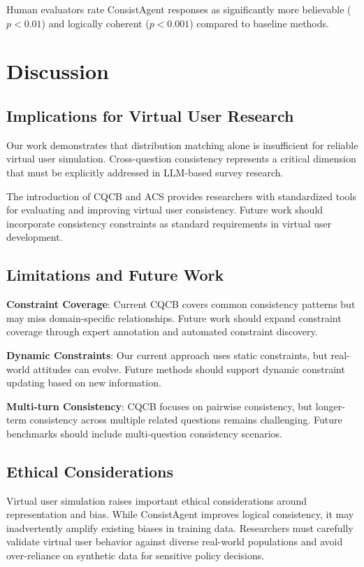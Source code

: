 \documentclass{article}
\begin{document}
Human evaluators rate ConsistAgent responses as significantly more believable ($p < 0.01$) and logically coherent ($p < 0.001$) compared to baseline methods.

\section{Discussion}

\subsection{Implications for Virtual User Research}

Our work demonstrates that distribution matching alone is insufficient for reliable virtual user simulation. Cross-question consistency represents a critical dimension that must be explicitly addressed in LLM-based survey research.

The introduction of CQCB and ACS provides researchers with standardized tools for evaluating and improving virtual user consistency. Future work should incorporate consistency constraints as standard requirements in virtual user development.

\subsection{Limitations and Future Work}

\textbf{Constraint Coverage}: Current CQCB covers common consistency patterns but may miss domain-specific relationships. Future work should expand constraint coverage through expert annotation and automated constraint discovery.

\textbf{Dynamic Constraints}: Our current approach uses static constraints, but real-world attitudes can evolve. Future methods should support dynamic constraint updating based on new information.

\textbf{Multi-turn Consistency}: CQCB focuses on pairwise consistency, but longer-term consistency across multiple related questions remains challenging. Future benchmarks should include multi-question consistency scenarios.

\subsection{Ethical Considerations}

Virtual user simulation raises important ethical considerations around representation and bias. While ConsistAgent improves logical consistency, it may inadvertently amplify existing biases in training data. Researchers must carefully validate virtual user behavior against diverse real-world populations and avoid over-reliance on synthetic data for sensitive policy decisions.
\end{document}
